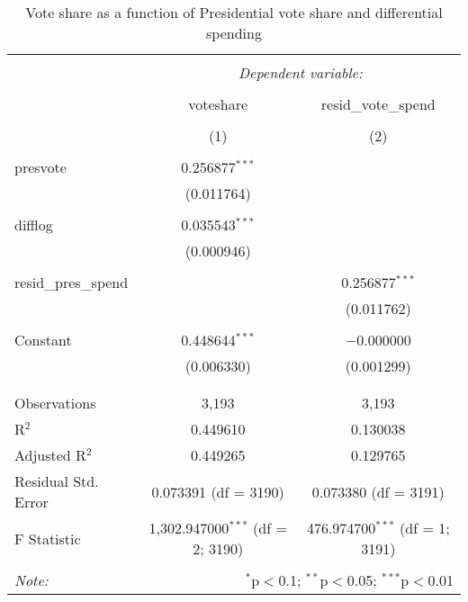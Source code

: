 
\begin{table}[!htbp] \centering 
  \caption{Vote share as a function of Presidential vote share and differential spending} 
  \label{tab:vote_spend_pres} 
\begin{tabular}{@{\extracolsep{5pt}}lcc} 
\\[-1.8ex]\hline 
\hline \\[-1.8ex] 
 & \multicolumn{2}{c}{\textit{Dependent variable:}} \\ 
\cline{2-3} 
\\[-1.8ex] & voteshare & resid\_vote\_spend \\ 
\\[-1.8ex] & (1) & (2)\\ 
\hline \\[-1.8ex] 
 presvote & 0.256877$^{***}$ &  \\ 
  & (0.011764) &  \\ 
  & & \\ 
 difflog & 0.035543$^{***}$ &  \\ 
  & (0.000946) &  \\ 
  & & \\ 
 resid\_pres\_spend &  & 0.256877$^{***}$ \\ 
  &  & (0.011762) \\ 
  & & \\ 
 Constant & 0.448644$^{***}$ & $-$0.000000 \\ 
  & (0.006330) & (0.001299) \\ 
  & & \\ 
\hline \\[-1.8ex] 
Observations & 3,193 & 3,193 \\ 
R$^{2}$ & 0.449610 & 0.130038 \\ 
Adjusted R$^{2}$ & 0.449265 & 0.129765 \\ 
Residual Std. Error & 0.073391 (df = 3190) & 0.073380 (df = 3191) \\ 
F Statistic & 1,302.947000$^{***}$ (df = 2; 3190) & 476.974700$^{***}$ (df = 1; 3191) \\ 
\hline 
\hline \\[-1.8ex] 
\textit{Note:}  & \multicolumn{2}{r}{$^{*}$p$<$0.1; $^{**}$p$<$0.05; $^{***}$p$<$0.01} \\ 
\end{tabular} 
\end{table}  
